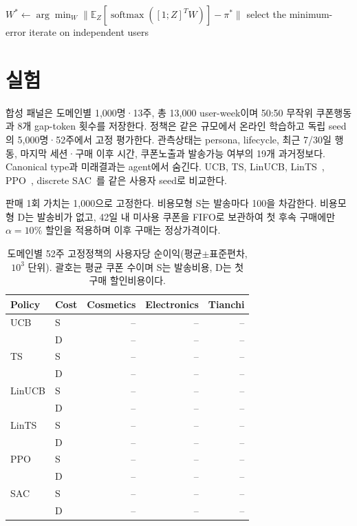 \documentclass[9pt,twocolumn]{extarticle}
\begin{document}
\clearpage
\begin{algorithm}[t]
\caption{Sequential uplift calibration}
\label{alg:uplift}
$W^*\leftarrow\arg\min_W\|\mathbb E_Z[\operatorname{softmax}([1;Z]^TW)]-\pi^*\|$\;
select the minimum-error iterate on independent users\;
\end{algorithm}

\section{실험}
합성 패널은 도메인별 1,000명·13주, 총 13,000 user-week이며 50:50 무작위
쿠폰행동과 8개 gap-token 횟수를 저장한다. 정책은 같은 규모에서 온라인 학습하고
독립 seed의 5,000명·52주에서 고정 평가한다. 관측상태는 persona, lifecycle,
최근 7/30일 행동, 마지막 세션·구매 이후 시간, 쿠폰노출과 발송가능 여부의 19개
과거정보다. Canonical type과 미래결과는 agent에서 숨긴다. UCB, TS, LinUCB,
LinTS~\cite{li2010,agrawal2013}, PPO~\cite{schulman2017}, discrete SAC~\cite{haarnoja2018}를
같은 사용자 seed로 비교한다.

판매 1회 가치는 1,000으로 고정한다. 비용모형 S는 발송마다 100을 차감한다.
비용모형 D는 발송비가 없고, 42일 내 미사용 쿠폰을 FIFO로 보관하여 첫 후속
구매에만 $\alpha=10\%$ 할인을 적용하며 이후 구매는 정상가격이다.

\begin{table}[t]
\centering
\caption{도메인별 52주 고정정책의 사용자당 순이익(평균$\pm$표준편차,
$10^3$ 단위). 괄호는 평균 쿠폰 수이며 S는 발송비용, D는 첫 구매 할인비용이다.}
\label{tab:benchmark}
\scriptsize
\setlength{\tabcolsep}{2.2pt}
\begin{tabular}{llrrr}
\toprule
Policy&Cost&Cosmetics&Electronics&Tianchi\\
\midrule
UCB&S&--&--&--\\
   &D&--&--&--\\
TS&S&--&--&--\\
  &D&--&--&--\\
LinUCB&S&--&--&--\\
      &D&--&--&--\\
LinTS&S&--&--&--\\
     &D&--&--&--\\
PPO&S&--&--&--\\
   &D&--&--&--\\
SAC&S&--&--&--\\
   &D&--&--&--\\
\bottomrule
\end{tabular}
\end{table}
\FloatBarrier
\end{document}
